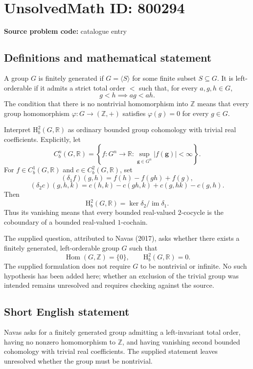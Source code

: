 \documentclass[11pt]{article}
\newcommand{\Z}{\mathbb{Z}}
\newcommand{\R}{\mathbb{R}}
\begin{document}
\section*{UnsolvedMath ID: 800294}
\textbf{Source problem code:} catalogue entry
\subsection{Definitions and mathematical statement}
A group \(G\) is finitely generated if \(G=\langle S\rangle\) for some finite subset \(S\subseteq G\). It is left-orderable if it admits a strict total order \(<\) such that, for every \(a,g,h\in G\),
\[
g<h\implies ag<ah.
\]
The condition that there is no nontrivial homomorphism into \(\Z\) means that every group homomorphism \(\varphi:G\to(\Z,+)\) satisfies \(\varphi(g)=0\) for every \(g\in G\).

Interpret \(\mathrm H_b^2(G,\R)\) as ordinary bounded group cohomology with trivial real coefficients. Explicitly, let
\[
C_b^n(G,\R)=\left\{f:G^n\to\R:\sup_{\mathbf g\in G^n}|f(\mathbf g)|<\infty\right\}.
\]
For \(f\in C_b^1(G,\R)\) and \(c\in C_b^2(G,\R)\), set
\[
(\delta_1f)(g,h)=f(h)-f(gh)+f(g),
\]
\[
(\delta_2c)(g,h,k)=c(h,k)-c(gh,k)+c(g,hk)-c(g,h).
\]
Then
\[
\mathrm H_b^2(G,\R)=\ker\delta_2/\operatorname{im}\delta_1.
\]
Thus its vanishing means that every bounded real-valued \(2\)-cocycle is the coboundary of a bounded real-valued \(1\)-cochain.

The supplied question, attributed to Navas (2017), asks whether there exists a finitely generated, left-orderable group \(G\) such that
\[
\operatorname{Hom}(G,\Z)=\{0\},
\qquad
\mathrm H_b^2(G,\R)=0.
\]
The supplied formulation does not require \(G\) to be nontrivial or infinite. No such hypothesis has been added here; whether an exclusion of the trivial group was intended remains unresolved and requires checking against the source.
\subsection{Short English statement}
Navas asks for a finitely generated group admitting a left-invariant total order, having no nonzero homomorphism to \(\Z\), and having vanishing second bounded cohomology with trivial real coefficients. The supplied statement leaves unresolved whether the group must be nontrivial.
\end{document}
